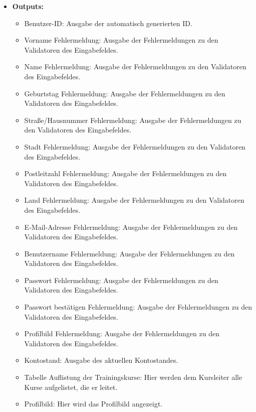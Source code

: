 \begin{itemize}
				
			\item \textbf{Outputs:}
				\begin{itemize}
					\item Benutzer-ID: Ausgabe der automatisch generierten ID.
					\item Vorname Fehlermeldung: Ausgabe der Fehlermeldungen zu den Validatoren des Eingabefeldes.
					\item Name Fehlermeldung: Ausgabe der Fehlermeldungen zu den Validatoren des Eingabefeldes.
					\item Geburtstag Fehlermeldung: Ausgabe der Fehlermeldungen zu den Validatoren des Eingabefeldes.
					\item Straße/Hausnummer Fehlermeldung: Ausgabe der Fehlermeldungen zu den Validatoren des Eingabefeldes.
					\item Stadt Fehlermeldung: Ausgabe der Fehlermeldungen zu den Validatoren des Eingabefeldes.
					\item Postleitzahl Fehlermeldung: Ausgabe der Fehlermeldungen zu den Validatoren des Eingabefeldes.
					\item Land Fehlermeldung: Ausgabe der Fehlermeldungen zu den Validatoren des Eingabefeldes.
					\item E-Mail-Adresse Fehlermeldung: Ausgabe der Fehlermeldungen zu den Validatoren des Eingabefeldes.
					\item Benutzername Fehlermeldung: Ausgabe der Fehlermeldungen zu den Validatoren des Eingabefeldes.
					\item Passwort Fehlermeldung: Ausgabe der Fehlermeldungen zu den Validatoren des Eingabefeldes.
					\item Passwort bestätigen Fehlermeldung: Ausgabe der Fehlermeldungen zu den Validatoren des Eingabefeldes.
					\item Profilbild Fehlermeldung: Ausgabe der Fehlermeldungen zu den Validatoren des Eingabefeldes.
					\item Kontostand: Ausgabe des aktuellen Kontostandes.
					\item Tabelle Auflistung der Trainingskurse: Hier werden dem Kursleiter alle Kurse aufgelistet, die er leitet.
					\item Profilbild: Hier wird das Profilbild angezeigt.
				\end{itemize}
				
				\begin{center}
					\begin{longtable}{|p{5cm} | p{4cm}|p{5cm}|}
						

\end{longtable}
\end{center}
\end{itemize}
